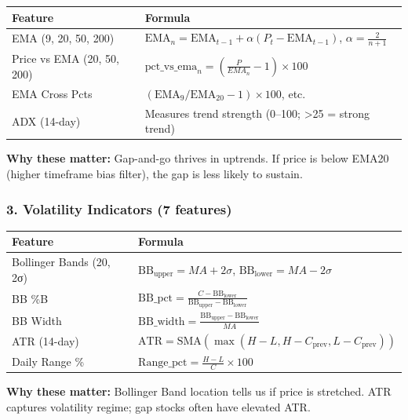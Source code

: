\documentclass[11pt,a4paper]{article}
\begin{document}
\begin{table}[h]
\centering
\begin{tabular}{ll}
\toprule
\textbf{Feature} & \textbf{Formula} \\
\midrule
EMA (9, 20, 50, 200) & $\text{EMA}_n = \text{EMA}_{t-1} + \alpha(P_t - \text{EMA}_{t-1})$, $\alpha = \frac{2}{n+1}$ \\
Price vs EMA (20, 50, 200) & $\text{pct\_vs\_ema}_n = \left(\frac{P}{EMA_n} - 1\right) \times 100$ \\
EMA Cross Pcts & $(\text{EMA}_9 / \text{EMA}_{20} - 1) \times 100$, etc. \\
ADX (14-day) & Measures trend strength (0–100; >25 = strong trend) \\
\bottomrule
\end{tabular}
\end{table}

\textbf{Why these matter:} Gap-and-go thrives in uptrends. If price is below EMA20 (higher timeframe bias filter), the gap is less likely to sustain.

\subsubsection{3. Volatility Indicators (7 features)}

\begin{table}[h]
\centering
\begin{tabular}{ll}
\toprule
\textbf{Feature} & \textbf{Formula} \\
\midrule
Bollinger Bands (20, 2σ) & $\text{BB}_{\text{upper}} = MA + 2\sigma$, $\text{BB}_{\text{lower}} = MA - 2\sigma$ \\
BB \%B & $\text{BB\_pct} = \frac{C - \text{BB}_{\text{lower}}}{\text{BB}_{\text{upper}} - \text{BB}_{\text{lower}}}$ \\
BB Width & $\text{BB\_width} = \frac{\text{BB}_{\text{upper}} - \text{BB}_{\text{lower}}}{MA}$ \\
ATR (14-day) & $\text{ATR} = \text{SMA}(\max(H - L, H - C_{\text{prev}}, L - C_{\text{prev}}))$ \\
Daily Range \% & $\text{Range\_pct} = \frac{H - L}{C} \times 100$ \\
\bottomrule
\end{tabular}
\end{table}

\textbf{Why these matter:} Bollinger Band location tells us if price is stretched. ATR captures volatility regime; gap stocks often have elevated ATR.
\end{document}
